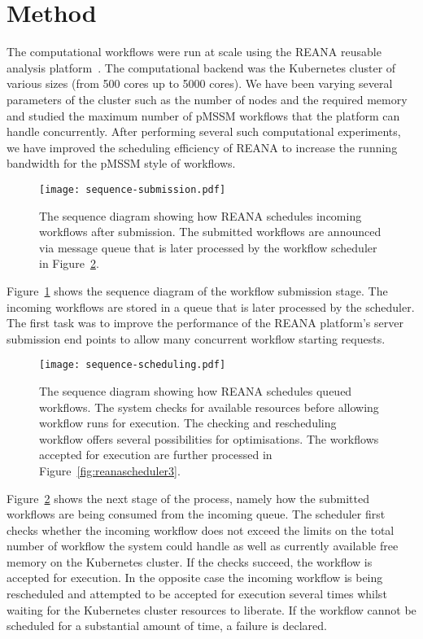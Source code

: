 \section{Method}\label{sec:method}

The computational workflows were run at scale using the REANA reusable analysis platform~\cite{ref:chep2018}.
The computational backend was the Kubernetes cluster of various sizes (from 500 cores up to 5000 cores).
We have been varying several parameters of the cluster such as the number of nodes and the required memory and studied the maximum number of pMSSM workflows that the platform can handle concurrently.
After performing several such computational experiments, we have improved the scheduling efficiency of REANA to increase the running bandwidth for the pMSSM style of workflows.

\begin{figure}
\centering
\texttt{[image: sequence-submission.pdf]}
\caption{The sequence diagram showing how REANA schedules incoming workflows after submission.
The submitted workflows are announced via message queue that is later processed by the workflow scheduler in Figure~\ref{fig:reanascheduler2}.}
\label{fig:reanascheduler1}
\end{figure}

Figure~\ref{fig:reanascheduler1} shows the sequence diagram of the workflow submission stage.
The incoming workflows are stored in a queue that is later processed by the scheduler.
The first task was to improve the performance of the REANA platform's server submission end points to allow many concurrent workflow starting requests.

\begin{figure}
\centering
\texttt{[image: sequence-scheduling.pdf]}
\caption{The sequence diagram showing how REANA schedules queued workflows.
The system checks for available resources before allowing workflow runs for execution.
The checking and rescheduling workflow offers several possibilities for optimisations.
The workflows accepted for execution are further processed in Figure~\ref{fig:reanascheduler3}.}
\label{fig:reanascheduler2}
\end{figure}

Figure~\ref{fig:reanascheduler2} shows the next stage of the process, namely how the submitted workflows are being consumed from the incoming queue.
The scheduler first checks whether the incoming workflow does not exceed the limits on the total number of workflow the system could handle as well as currently available free memory on the Kubernetes cluster.
If the checks succeed, the workflow is accepted for execution.
In the opposite case the incoming workflow is being rescheduled and attempted to be accepted for execution several times whilst waiting for the Kubernetes cluster resources to liberate.
If the workflow cannot be scheduled for a substantial amount of time, a failure is declared.

